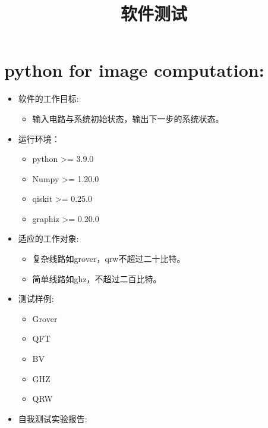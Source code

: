 \documentclass{article}
\title{软件测试}
\begin{document}
\maketitle
\section{python for image computation:}
\begin{itemize}
    \item {软件的工作目标:} 
    \begin{itemize}
        \item   输入电路与系统初始状态，输出下一步的系统状态。
    \end{itemize}
    \item {运行环境：} 
    \begin{itemize}
        \item python >= 3.9.0
        \item Numpy >= 1.20.0
        \item qiskit >= 0.25.0
        \item graphiz >= 0.20.0
    \end{itemize} 
    \item {适应的工作对象:}
    \begin{itemize}
        \item 复杂线路如grover，qrw不超过二十比特。
        \item 简单线路如ghz，不超过二百比特。
    \end{itemize}
    \item {测试样例:}
    \begin{itemize}
        \item Grover
        \item QFT
        \item BV
        \item GHZ
        \item QRW
    \end{itemize}
    \item {自我测试实验报告:}
    \begin{table}[!htbp]
        \centering
\end{table}
\end{itemize}
\end{document}
